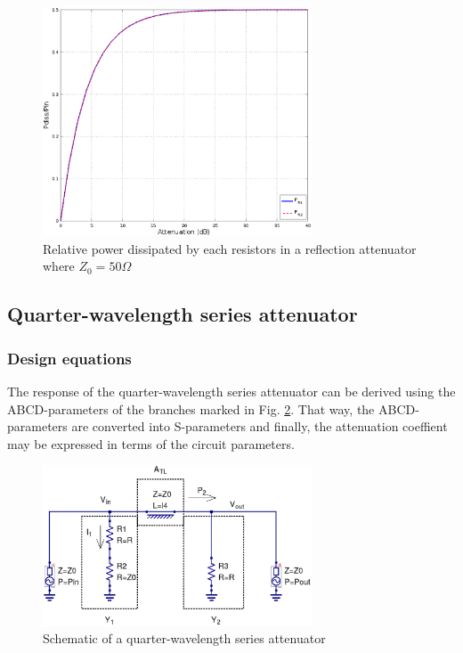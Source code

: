 \begin{figure}[ht]
\begin{center}
\includegraphics[width=8cm]{bitmaps/synthesis/attenuators/Relative-dissipated-reflection-attenuator}
\end{center}
\caption{Relative power dissipated by each resistors in a reflection attenuator where $Z_{0} = 50\Omega$}
\label{fig:reflec-attenuator-pow-diss}
\end{figure}
\FloatBarrier

\clearpage
\subsection{Quarter-wavelength series attenuator}
\subsubsection{Design equations}
\noindent The response of the quarter-wavelength series attenuator can be derived using the ABCD-parameters of the branches marked in Fig. \ref{fig:qw-series-att-schematic}. That way, the ABCD-parameters are converted into S-parameters and finally, the attenuation coeffient may be expressed in terms of the circuit parameters.

\begin{figure}[ht]
\begin{center}
\includegraphics[width=8cm]{bitmaps/synthesis/attenuators/QW-Series-Attenuator-Schematic}
\end{center}
\caption{Schematic of a quarter-wavelength series attenuator}
\label{fig:qw-series-att-schematic}
\end{figure}
\FloatBarrier


